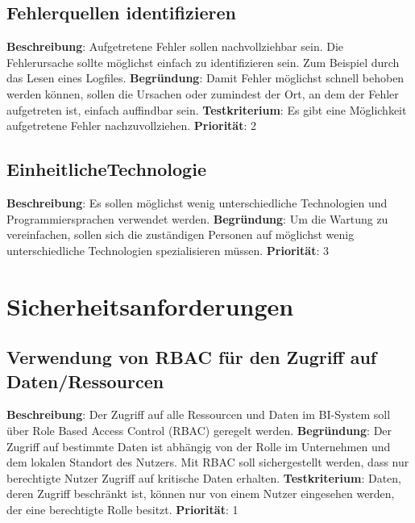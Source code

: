 \subsection{Fehlerquellen identifizieren} \label{sec:anforderungsspezifikation:fehlerquellenIdentifizieren}
\textbf{Beschreibung}: Aufgetretene Fehler sollen nachvollziehbar sein. Die Fehlerursache sollte möglichst einfach zu identifizieren sein. Zum Beispiel durch das Lesen eines Logfiles.
\newline \textbf{Begründung}: Damit Fehler möglichst schnell behoben werden können, sollen die Ursachen oder zumindest der Ort, an dem der Fehler aufgetreten ist, einfach auffindbar sein.
\newline \textbf{Testkriterium}: Es gibt eine Möglichkeit aufgetretene Fehler nachzuvollziehen.
\newline \textbf{Priorität}: 2

\subsection{EinheitlicheTechnologie} \label{sec:anforderungsspezifikation:einheitlicheTechnologie}
\textbf{Beschreibung}: Es sollen möglichst wenig unterschiedliche Technologien und Programmiersprachen verwendet werden.
\newline \textbf{Begründung}: Um die Wartung zu vereinfachen, sollen sich die zuständigen Personen auf möglichst wenig unterschiedliche Technologien spezialisieren müssen.
\newline \textbf{Priorität}: 3

\section{Sicherheitsanforderungen}

\subsection{Verwendung von RBAC für den Zugriff auf Daten/Ressourcen} \label{sec:anforderungsspezifikation:rbac}
\textbf{Beschreibung}: Der Zugriff auf alle Ressourcen und Daten im BI-System soll über Role Based Access Control (RBAC) geregelt werden.
\newline \textbf{Begründung}: Der Zugriff auf bestimmte Daten ist abhängig von der Rolle im Unternehmen und dem lokalen Standort des Nutzers. Mit RBAC soll sichergestellt werden, dass nur berechtigte Nutzer Zugriff auf kritische Daten erhalten.
\newline \textbf{Testkriterium}: Daten, deren Zugriff beschränkt ist, können nur von einem Nutzer eingesehen werden, der eine berechtigte Rolle besitzt.
\newline \textbf{Priorität}: 1

